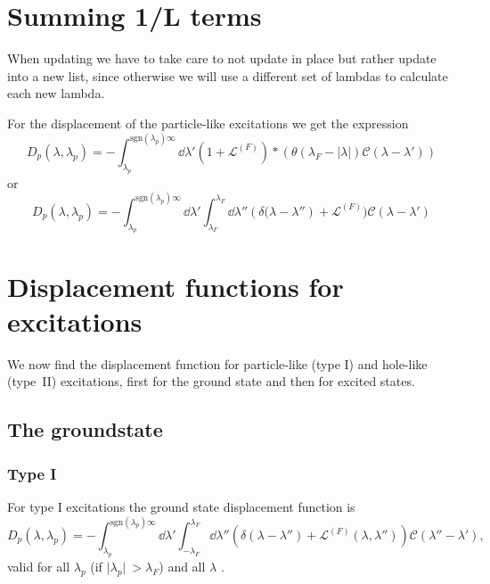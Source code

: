 \documentclass[11pt, a4paper,draft]{report} %
\newcommand{\inversetruncc}{\mathcal{L}}
\newcommand{\kernel}{\mathcal{C}}
\begin{document}
\section{Summing 1/L terms}

When updating we have to take care to not update in place but rather update into a new list, since otherwise we will use a different set of lambdas to calculate each new lambda.

For the displacement of the particle-like excitations we get the expression
\begin{equation}
	D_p(\lambda, \lambda_p) = - \int_{\lambda_p}^{\textrm{sgn}(\lambda_p)\infty} \dd \lambda'(1 + \inversetruncc^{(F)}) * \left(\theta(\lambda_F-\lvert\lambda\rvert) \kernel(\lambda-\lambda')\right) 
\end{equation}
or
\begin{equation}
	D_p(\lambda, \lambda_p) = - \int_{\lambda_p}^{\textrm{sgn}(\lambda_p)\infty} \dd \lambda' \int_{\lambda_F}^{\lambda_F} \dd  \lambda'' \left(\delta(\lambda-\lambda''\right) + \inversetruncc^{(F)}) \kernel(\lambda-\lambda')
\end{equation}


\newpage

\section{Displacement functions for excitations}
We now find the displacement function for particle-like (type I) and hole-like (type~II) excitations, first for the ground state and then for excited states.

\subsection{The groundstate}
\subsubsection{Type I}
For type I excitations the ground state displacement function is 
\begin{equation}\label{eq:particledisplacement}
	D_p(\lambda, \lambda_p) = - \int_{\lambda_p}^{\textrm{sgn}(\lambda_p)\infty} \dd \lambda' \int_{-\lambda_F}^{\lambda_F} \dd  \lambda'' \left(\delta(\lambda-\lambda'') + \inversetruncc^{(F)}(\lambda,\lambda'') \right)\kernel(\lambda''-\lambda'),
\end{equation}
valid for all \(\lambda_p\) (if \(\lvert \lambda_p \rvert\ > \lambda_F\)) and all \(\lambda\) \cite{tofind}.
\end{document}
